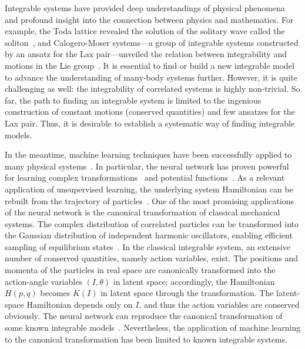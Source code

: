 
Integrable systems have provided deep understandings of physical phenomena and profound insight into the connection between physics and mathematics.
For example, the Toda lattice revealed the solution of the solitary wave called the soliton~\cite{Toda1967,Toda1967-2}, and Calogero-Moser systems---a group of integrable systems constructed by an ansatz for the Lax pair---unveiled the relation between integrability and motions in the Lie group~\cite{Calogero1975,Calogero1976,Moser1975}.
It is essential to find or build a new integrable model to advance the understanding of many-body systems further.
However, it is quite challenging as well: the integrability of correlated systems is highly non-trivial.
So far, the path to finding an integrable system is limited to the ingenious construction of constant motions (conserved quantities) and few ansatzes for the Lax pair.
Thus, it is desirable to establish a systematic way of finding integrable models.

In the meantime, machine learning techniques have been successfully applied to many physical systems~\cite{Carleo-etal2019}.
In particular, the neural network has proven powerful for learning complex transformations~\cite{Noe-etal2019,Shuo-Hui-etal2020,Bondesan-Lamacraft2019} and potential functions~\cite{Greydanus-Dzamba-Yosinki2019,Suwa2019}.
As a relevant application of unsupervised learning, the underlying system Hamiltonian can be rebuilt from the trajectory of particles~\cite{Greydanus-Dzamba-Yosinki2019}.
One of the most promising applications of the neural network is the canonical transformation of classical mechanical systems.
The complex distribution of correlated particles can be transformed into the Gaussian distribution of independent harmonic oscillators, enabling efficient sampling of equilibrium states~\cite{Noe-etal2019,Shuo-Hui-etal2020}.
In the classical integrable system, an extensive number of conserved quantities, namely action variables, exist.
The positions and momenta of the particles in real space are canonically transformed into the action-angle variables $(I,\theta)$ in latent space; accordingly, the Hamiltonian $H(p,q)$ becomes $K(I)$ in latent space through the transformation.
The latent-space Hamiltonian depends only on $I$, and thus the action variables are conserved obviously.
The neural network can reproduce the canonical transformation of some known integrable models~\cite{Bondesan-Lamacraft2019}.
Nevertheless, the application of machine learning to the canonical transformation has been limited to known integrable systems.

